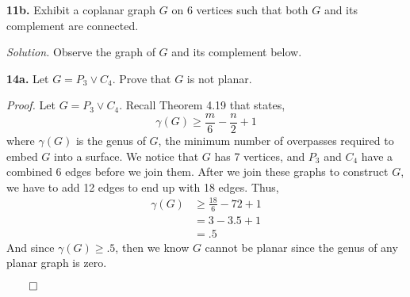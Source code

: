 \documentclass{article}
\begin{document}
\setlength{\parindent}{0cm}   %






\textbf{11b.} Exhibit a coplanar graph \(G\) on 6 vertices such that both \(G\) and its complement are connected. 

\vspace{3mm}
\textit{Solution.} Observe the graph of \(G\) and its complement below. 


\vspace{60mm}

\textbf{14a.} Let \(G=P_3 \vee C_4\). Prove that \(G\) is not planar. 

\vspace{3mm}
\textit{Proof.} Let \(G=P_3 \vee C_4\). Recall Theorem 4.19 that states, 
\[
\gamma(G) \geq \frac m6 - \frac n2 + 1
\]
where \(\gamma(G)\) is the genus of \(G\), the minimum number of overpasses required to embed \(G\) into a surface. We notice that \(G\) has 7 vertices, and \(P_3\) and \(C_4\) have a combined 6 edges before we join them. After we join these graphs to construct \(G\), we have to add 12 edges to end up with 18 edges. Thus, 
\begin{align*}
\gamma(G) &\geq \frac{18}{6} - {7}{2} +1 \\
&=3- 3.5 + 1\\
&= .5
\end{align*}
And since \(\gamma(G) \geq .5\), then we know \(G\) cannot be planar since the genus of any planar graph is zero. 
\begin{flushright}
\(\qed\)
\end{flushright}
\end{document}

